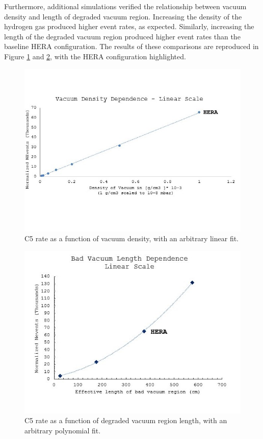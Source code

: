 Furthermore, additional simulations verified the relationship between vacuum density and length of degraded vacuum region.  Increasing the density of the hydrogen gas produced higher event rates, as expected.  Similarly, increasing the length of the degraded vacuum region produced higher event rates than the baseline HERA configuration.  The results of these comparisons are reproduced in Figure \ref{fig:hera5} and \ref{fig:hera6}, with the HERA configuration highlighted.

\begin{figure}
	\centering
	\includegraphics[width=.75\textwidth]{../../img/density_dep_lin_crop.jpg}
	\caption {C5 rate as a function of vacuum density, with an arbitrary linear fit.}
	\label{fig:hera5}
\end{figure}	
		
\begin{figure}
	\centering	\includegraphics[width=.75\textwidth]{../../img/length_dep_poly_crop.jpg}	
	\caption {C5 rate as a function of degraded vacuum region length, with an arbitrary polynomial fit.}
	\label{fig:hera6}
\end{figure}



